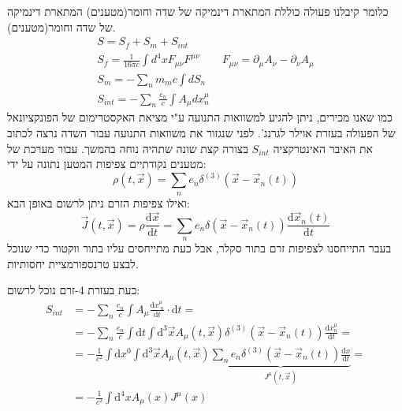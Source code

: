 \documentclass{tstextbook}
\begin{document}
כלומר קיבלנו פעולה כוללת המתארת דינמיקה של שדה וחומר(מטענים) המתארת דינמיקה של שדה וחומר(מטענים).
\begin{gather*}S=S_{f}+S_{m}+S_{int}  \\S_{f}=\frac{1}{16\pi c}\int d^4x F_{\mu \nu}F^{\mu \nu} \qquad  F_{\mu \nu}=\partial_{\mu}A_{\nu}-\partial_{\nu}A_{\mu}\\S_{m}=-\sum_{n}m_{m}c\int dS_{n} \\S_{int} = - \sum_{n} \frac{e_{n}}{c}\int A_{\mu} dx^\mu_{n}
\end{gather*}
כמו שאנו מכירים, ניתן להגיע למשוואות התנועה ע"י מציאת האקסטרימום של הפונקציונאל של הפעולה בעזרת אוילר לגרנג'. לפני שנגזור את משוואות התנועה עבור השדה נרצה לכתוב את האיבר האינטרקציה \(S_{int}\) בצורה קצת שונה שתהיה נוחה בהמשך. עבור מערכת של מטענים נקודתיים צפיפות המטען נתונה על ידי:
$$\rho\left( t,\vec{x} \right)=\sum_{n} e_{n}\delta^{(3)}\left( \vec{x}-\vec{x}_{n}(t) \right)$$
ואילו צפיפות הזרם ניתן לרשום באופן הבא:
$$\vec{J}\left( t,\vec{x} \right)=\rho\frac{ \mathrm{d}\vec{x}}{\mathrm{d}t}=\sum_{n} e_{n}\delta\left( \vec{x}-\vec{x}_{n}(t) \right) \frac{\mathrm{d}\vec{x}_{n}(t)}{\mathrm{d}t}$$
בעבר התייחסנו לצפיפות זרם בתור סקלר, אבל כעת מתייחסים עליו בתור ווקטור כדי שנוכל לבצע טרנספורמציית יחסותיות.

כעת בעזרת 4-זרם נוכל לרשום:
$$\begin{align}S_{int}&=-\sum_{n} \frac{e_{n}}{c}\int A_{\mu} \frac{\mathrm{d}x^\mu_{\;n}}{\mathrm{d}t} \cdot \mathrm{d}t= \\&=-\sum_{n} \frac{e_{n}}{c}\int \mathrm{d}t \int\mathrm{d}^3 \vec{x}A_{\mu}\left( t,\vec{x} \right)\delta^{(3)}\left( \vec{x}-\vec{x}_{n}(t) \right) \frac{\mathrm{d}x^\mu_{n}}{\mathrm{d}t} = \\&=-\frac{1}{c^2} \int \mathrm{d}x^0 \int \mathrm{d}^3\vec{x} A_{\mu}\left( t,\vec{x} \right)\underbrace{ \sum_{n} e_{n}\delta^{(3)}\left( \vec{x}-\vec{x}_{n}(t) \right) \frac{\mathrm{d}x}{\mathrm{d}t} }_{ J^\mu\left( t,\vec{x} \right) }= \\&=-\frac{1}{c^2}\int \mathrm{d}^4 x A_{\mu}(x) J^\mu(x) 
\end{align}$$
\end{document}
